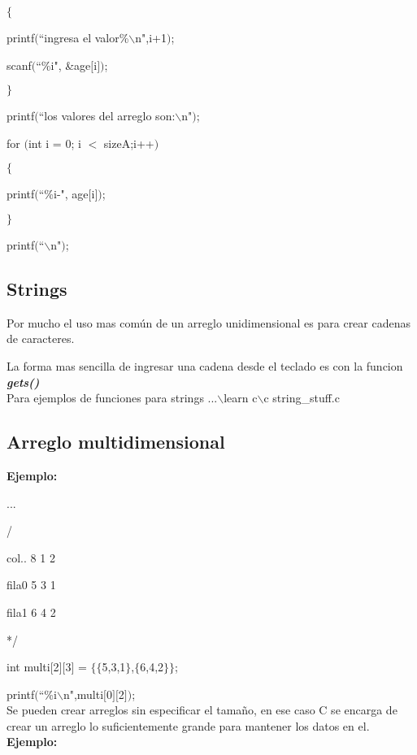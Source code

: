 \documentclass[]{article}
\begin{document}
	$\lbrace$
	
	printf$($``ingresa el valor\%$\backslash$n",i+1$)$;
	
	scanf$($``\%i", \&age$[$i$]$$)$;
	
	$\rbrace$
	
	printf$($``los valores del arreglo son:$\backslash$n"$)$;
	
	for $($int i = 0; i $<$ sizeA;i++$)$
	
	$\lbrace$
	
	printf$($``\%i-", age$[$i$]$$)$;
	
	$\rbrace$
	
	printf$($``$\backslash$n"$)$;
	
	\subsection{Strings}
	Por mucho el uso mas común de un arreglo unidimensional es para crear cadenas de caracteres.
	
	La forma mas sencilla de ingresar una cadena desde el teclado es con la funcion \textbf{\textit{gets()}}\\
	
	Para ejemplos de funciones para strings ...$\backslash$learn c$\backslash$c string\_stuff.c
	
	\subsection{Arreglo multidimensional}
	
	\textbf{Ejemplo:\\}
	
	...
	
	\slash*
	
	col..	8	1	2
	
	fila0 	5	3	1
	
	fila1	6	4	2
	
	*\slash
	
	int multi$[$2$]$$[$3$]$ = $\lbrace$$\lbrace$5,3,1$\rbrace$,$\lbrace$6,4,2$\rbrace$$\rbrace$;
	
	printf$($``\%i$\backslash$n",multi$[$0$]$$[$2$]$$)$;\\
	
		Se pueden crear arreglos sin especificar el tamaño, en ese caso C se encarga de crear un arreglo lo suficientemente grande para mantener los datos en el.\\
	
	\textbf{Ejemplo:\\}
	
\end{document}
